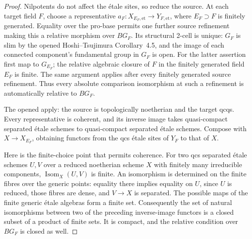 \documentclass[11pt,a4paper]{article}
\begin{document}
\begin{proof}
Nilpotents do not affect the étale sites, so reduce the source.
At each target field \(F\), choose a representative
\(a_F:X_{E_F,\mathrm{et}}\to Y_{F,\mathrm{et}}\), where
\(E_F\supset F\) is finitely generated. Equality over the pro-base
permits one further source refinement making this a relative
morphism over \(BG_F\). Its structural 2-cell is unique:
\(G_F\) is slim by the opened Hoshi--Tsujimura Corollary~4.5,
and the image of each connected component's fundamental group in
\(G_F\) is open. For the latter assertion first map to \(G_{E_F}\);
the relative algebraic closure of \(F\) in the finitely generated
field \(E_F\) is finite. The same argument applies after every
finitely generated source refinement. Thus every absolute
comparison isomorphism at such a refinement is automatically
relative to \(BG_F\).

The opened \citep[Theorem~A.8 and Corollary~A.9]{CarlsonHaineWolf2024}
apply: the source is topologically noetherian and the target qcqs.
Every representative is coherent, and its inverse image takes
quasi-compact separated étale schemes to quasi-compact separated
étale schemes. Compose with \(X\to X_{E_F}\), obtaining functors
from the qcs étale sites of \(Y_F\) to that of \(X\).

Here is the finite-choice point that permits coherence. For two
qcs separated étale schemes \(U,V\) over a reduced noetherian
scheme \(X\) with finitely many irreducible components,
\(\operatorname{Isom}_X(U,V)\) is finite. An isomorphism is
determined on the finite fibres over the generic points: equality
there implies equality on \(U\), since \(U\) is reduced, those
fibres are dense, and \(V\to X\) is separated. The possible maps
of the finite generic étale algebras form a finite set.
Consequently the set of natural isomorphisms between two of the
preceding inverse-image functors is a closed subset of a product
of finite sets. It is compact, and the relative condition over
\(BG_F\) is closed as well.


\end{proof}
\end{document}
